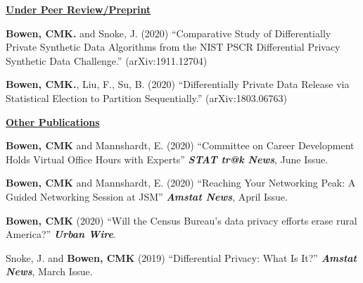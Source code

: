 \documentclass[11pt, letterpaper, roman]{moderncv} %
\begin{document}
\begin{etaremune}[topsep=0pt, itemsep=6pt, partopsep=0pt, parsep=0pt]
\vspace{6pt}
\hspace{-0.30in}\noindent\underline{\textbf{Under Peer Review/Preprint}}
    \item \textbf{Bowen, CMK.} and Snoke, J. (2020) ``Comparative Study of Differentially Private Synthetic Data Algorithms from the NIST PSCR Differential Privacy Synthetic Data Challenge.''
    (arXiv:1911.12704)

    \item \textbf{Bowen, CMK.}, Liu, F., Su, B. (2020) ``Differentially Private Data Release via Statistical Election to Partition Sequentially.''
    (arXiv:1803.06763)
\end{etaremune}

\vspace{6pt}
\noindent\underline{\textbf{Other Publications}}

\vspace{4pt}
\begin{etaremune}[topsep=0pt, itemsep=6pt, partopsep=0pt, parsep=0pt]
    \item \textbf{Bowen, CMK} and Mannshardt, E. (2020) ``Committee on Career Development Holds Virtual Office Hours with Experts'' \textbf{\textit{STAT tr@k News}}, June Issue.

    \item \textbf{Bowen, CMK} and Mannshardt, E. (2020) ``Reaching Your Networking Peak: A Guided Networking Session at JSM'' \textbf{\textit{Amstat News}}, April Issue.
    
    \item \textbf{Bowen, CMK} (2020) ``Will the Census Bureau's data privacy efforts erase rural America?'' \textbf{\textit{Urban Wire}}. 
    
    \item Snoke, J. and \textbf{Bowen, CMK} (2019) ``Differential Privacy: What Is It?'' \textbf{\textit{Amstat News}}, March Issue.
\end{etaremune}

    
    
\end{document}

